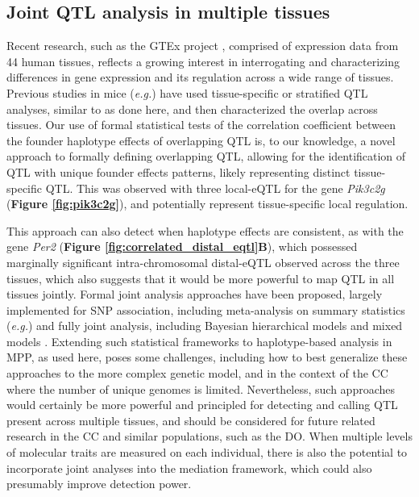\documentclass[9pt,twocolumn,twoside]{gsajnl}
\newcommand{\eg}{\emph{e.g.}\xspace}
\begin{document}
\subsection{Joint QTL analysis in multiple tissues}

Recent research, such as the GTEx project \citep{GTEX2017}, comprised of expression data from 44 human tissues, reflects a growing interest in interrogating and characterizing differences in gene expression and its regulation across a wide range of tissues. Previous studies in mice (\eg \citealt{Huang2009}) have used tissue-specific or stratified QTL analyses, similar to as done here, and then characterized the overlap across tissues. Our use of formal statistical tests of the correlation coefficient between the founder haplotype effects of overlapping QTL is, to our knowledge, a novel approach to formally defining overlapping QTL, allowing for the identification of QTL with unique founder effects patterns, likely representing distinct tissue-specific QTL. This was observed with three local-eQTL for the gene \textit{Pik3c2g} (\textbf{Figure \ref{fig:pik3c2g}}), and potentially represent tissue-specific local regulation.

This approach can also detect when haplotype effects are consistent, as with the gene \textit{Per2} (\textbf{Figure \ref{fig:correlated_distal_eqtl}B}), which possessed marginally significant intra-chromosomal distal-eQTL observed across the three tissues, which also suggests that it would be more powerful to map QTL in all tissues jointly. Formal joint analysis approaches have been proposed, largely implemented for SNP association, including meta-analysis on summary statistics (\eg \citealt{Fu2012a, Sul2013}) and fully joint analysis, including Bayesian hierarchical models \citep{Flutre2013} and mixed models \citep{Acharya2016}. Extending such statistical frameworks to haplotype-based analysis in MPP, as used here, poses some challenges, including how to best generalize these approaches to the more complex genetic model, and in the context of the CC where the number of unique genomes is limited. Nevertheless, such approaches would certainly be more powerful and principled for detecting and calling QTL present across multiple tissues, and should be considered for future related research in the CC and similar populations, such as the DO. When multiple levels of molecular traits are measured on each individual, there is also the potential to incorporate joint analyses into the mediation framework, which could also presumably improve detection power.
\end{document}
